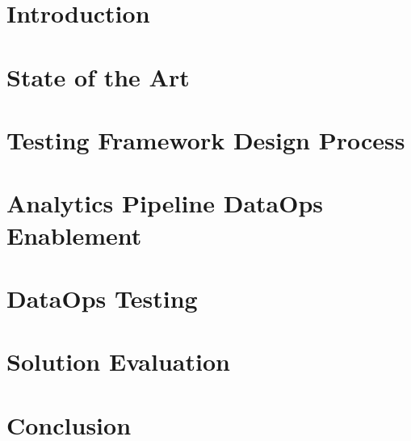	
	\chapter{Introduction}
		
		\label{chap:introduction}	

	\chapter{State of the Art}
		
		\label{chap:theoretical-backgrounds}

	\chapter{Testing Framework Design Process}
		
		\label{chap:testing-framework}

	\chapter{Analytics Pipeline DataOps Enablement}
		
		\label{chap:dataops-enablement}

	\chapter{DataOps Testing}
		
		\label{chap:dataops-testing}

	\chapter{Solution Evaluation}
		
		\label{chap:solution-evaluation}
	
	\chapter{Conclusion}
		
		\label{chap:conclusion}
		
		

	\pagestyle{plain}
	\clearpage
	\printbibliography

